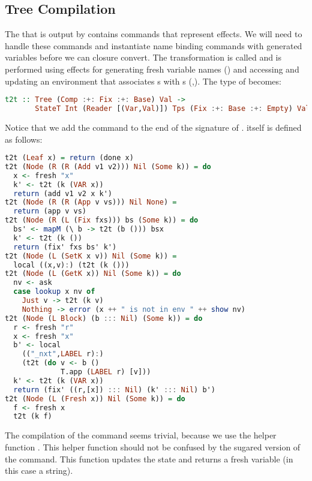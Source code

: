 \subsection{\label{subsection:semtosyn}Tree Compilation}
The  that is output by  contains commands that represent effects. We will need to handle these commands and instantiate name binding commands with generated variables before we can closure convert. The transformation is called  and is performed using effects for generating fresh variable names () and accessing and updating an environment that associates s with s (,). The type of  becomes:

\begin{lstlisting}[language=Haskell]
t2t :: Tree (Comp :+: Fix :+: Base) Val ->
       StateT Int (Reader [(Var,Val)]) Tps (Fix :+: Base :+: Empty) Val
\end{lstlisting}

Notice that we add the  command to the end of the signature of .  itself is defined as follows:

\begin{lstlisting}[language=Haskell]
t2t (Leaf x) = return (done x)
t2t (Node (R (R (Add v1 v2))) Nil (Some k)) = do
  x <- fresh "x"
  k' <- t2t (k (VAR x))
  return (add v1 v2 x k')
t2t (Node (R (R (App v vs))) Nil None) =
  return (app v vs)
t2t (Node (R (L (Fix fxs))) bs (Some k)) = do
  bs' <- mapM (\ b -> t2t (b ())) bsx
  k' <- t2t (k ())
  return (fix' fxs bs' k')
t2t (Node (L (SetK x v)) Nil (Some k)) =
  local ((x,v):) (t2t (k ()))
t2t (Node (L (GetK x)) Nil (Some k)) = do
  nv <- ask
  case lookup x nv of
    Just v -> t2t (k v)
    Nothing -> error (x ++ " is not in env " ++ show nv)
t2t (Node (L Block) (b ::: Nil) (Some k)) = do
  r <- fresh "r"
  x <- fresh "x"
  b' <- local
    (("_nxt",LABEL r):)
    (t2t (do v <- b ()
             T.app (LABEL r) [v]))
  k' <- t2t (k (VAR x))
  return (fix' ((r,[x]) ::: Nil) (k' ::: Nil) b')
t2t (Node (L (Fresh x)) Nil (Some k)) = do
  f <- fresh x
  t2t (k f)
\end{lstlisting}

The compilation of the  command seems trivial, because we use the helper function . This helper function should not be confused by the sugared version of the  command. This function updates the state and returns a fresh variable (in this case a string).

